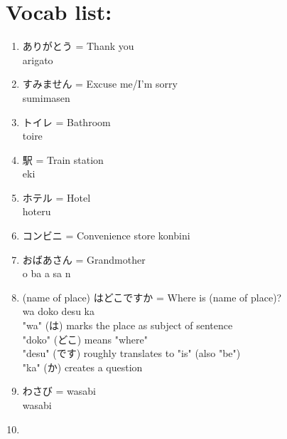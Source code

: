 \documentclass[12pt, letterpaper]{report}
\begin{document}
\chapter{Vocab list:}
\begin{enumerate}
	\item ありがとう = Thank you\\
		arigato
	\item すみません = Excuse me/I'm sorry\\
		sumimasen
	\item トイレ = Bathroom\\
		toire
	\item 駅 = Train station\\
		eki
	\item ホテル = Hotel\\
		hoteru
	\item コンビニ = Convenience store
		konbini
	\item おばあさん = Grandmother\\
		o ba a sa n
	\item (name of place) はどこですか = Where is (name of place)?\\
		wa doko desu ka\\
		"wa" (は) marks the place as subject of sentence\\
		"doko" (どこ) means "where"\\
		"desu" (です) roughly translates to "is" (also "be")\\
		"ka" (か) creates a question\\
	\item わさび = wasabi\\
		wasabi
	\item 
\end{enumerate}
\end{document}
